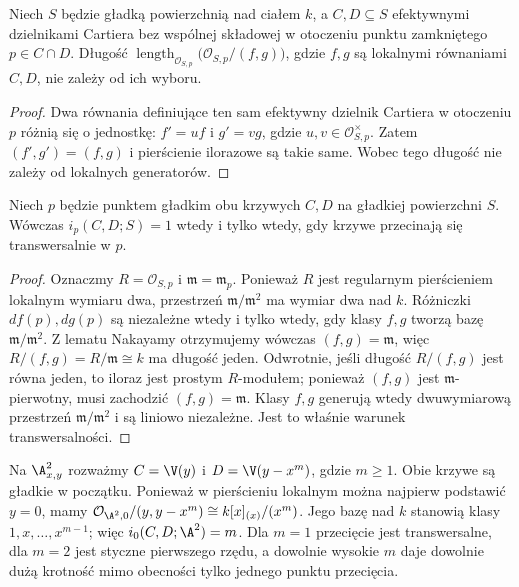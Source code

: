 \begin{stwierdzenie}
\label{st:ga6-independent-local}
Niech $S$ będzie gładką powierzchnią nad ciałem $k$,
a $C,D\subseteq S$ efektywnymi dzielnikami Cartiera
bez wspólnej składowej w otoczeniu punktu zamkniętego
$p\in C\cap D$. Długość
$\operatorname{length}_{\mathcal O_{S,p}}
\bigl(\mathcal O_{S,p}/(f,g)\bigr)$, gdzie $f,g$
są lokalnymi równaniami $C,D$, nie zależy od ich wyboru.
\end{stwierdzenie}
\begin{proof}
Dwa równania definiujące ten sam efektywny dzielnik
Cartiera w otoczeniu $p$ różnią się o jednostkę:
$f'=uf$ i $g'=vg$, gdzie $u,v\in\mathcal O_{S,p}^{\times}$.
Zatem $(f',g')=(f,g)$ i pierścienie ilorazowe są takie same.
Wobec tego długość nie zależy od lokalnych generatorów.
\end{proof}

\begin{stwierdzenie}
\label{st:ga6-transversal-one}
Niech $p$ będzie punktem gładkim obu krzywych $C,D$ na
gładkiej powierzchni $S$. Wówczas $i_p(C,D;S)=1$ wtedy
i tylko wtedy, gdy krzywe przecinają się transwersalnie w $p$.
\end{stwierdzenie}
\begin{proof}
Oznaczmy $R=\mathcal O_{S,p}$ i $\mathfrak m=\mathfrak m_p$.
Ponieważ $R$ jest regularnym pierścieniem lokalnym wymiaru dwa,
przestrzeń $\mathfrak m/\mathfrak m^2$ ma wymiar dwa nad $k$.
Różniczki $df(p),dg(p)$ są niezależne wtedy i tylko wtedy,
gdy klasy $f,g$ tworzą bazę $\mathfrak m/\mathfrak m^2$.
Z lematu Nakayamy otrzymujemy wówczas $(f,g)=\mathfrak m$,
więc $R/(f,g)=R/\mathfrak m\cong k$ ma długość jeden.
Odwrotnie, jeśli długość $R/(f,g)$ jest równa jeden,
to iloraz jest prostym $R$-modułem; ponieważ $(f,g)$ jest
$\mathfrak m$-pierwotny, musi zachodzić $(f,g)=\mathfrak m$.
Klasy $f,g$ generują wtedy dwuwymiarową przestrzeń
$\mathfrak m/\mathfrak m^2$ i są liniowo niezależne.
Jest to właśnie warunek transwersalności.
\end{proof}

\begin{przyklad}
\label{prz:ga6-tangent}
Na $\A^2_{x,y}$ rozważmy $C=\V(y)$ i $D=\V(y-x^m)$,
gdzie $m\ge1$. Obie krzywe są gładkie w początku.
Ponieważ w pierścieniu lokalnym można najpierw podstawić
$y=0$, mamy
$\mathcal O_{\A^2,0}/(y,y-x^m)\cong k[x]_{(x)}/(x^m)$.
Jego bazę nad $k$ stanowią klasy $1,x,\ldots,x^{m-1}$;
więc $i_0(C,D;\A^2)=m$. Dla $m=1$ przecięcie jest
transwersalne, dla $m=2$ jest styczne pierwszego rzędu,
a dowolnie wysokie $m$ daje dowolnie dużą krotność mimo
obecności tylko jednego punktu przecięcia.
\end{przyklad}

